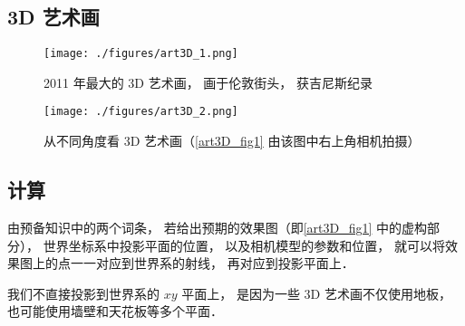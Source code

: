 
\begin{issues}
\issueNeedCite
\issueDraft
\end{issues}

\subsection{3D 艺术画}

\begin{figure}[ht]
\centering
\texttt{[image: ./figures/art3D\_1.png]}
\caption{2011 年最大的 3D 艺术画， 画于伦敦街头， 获吉尼斯纪录} \label{art3D_fig1}
\end{figure}

\begin{figure}[ht]
\centering
\texttt{[image: ./figures/art3D\_2.png]}
\caption{从不同角度看 3D 艺术画（\autoref{art3D_fig1} 由该图中右上角相机拍摄）} \label{art3D_fig2}
\end{figure}

\subsection{计算}


由预备知识中的两个词条， 若给出预期的效果图（即\autoref{art3D_fig1} 中的虚构部分）， 世界坐标系中投影平面的位置， 以及相机模型的参数和位置， 就可以将效果图上的点一一对应到世界系的射线， 再对应到投影平面上．

我们不直接投影到世界系的 $xy$ 平面上， 是因为一些 3D 艺术画不仅使用地板， 也可能使用墙壁和天花板等多个平面．

